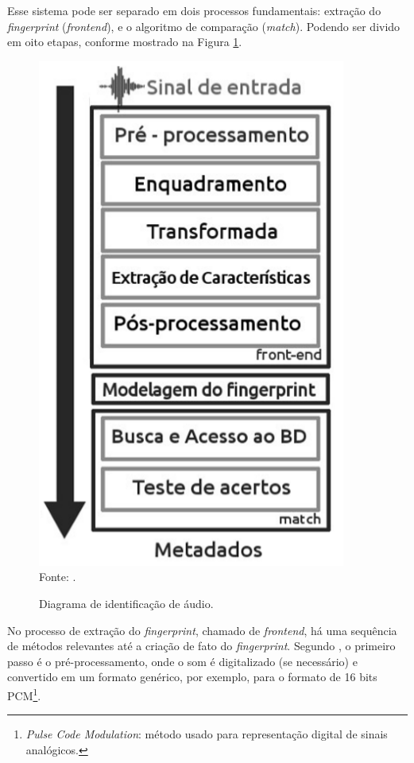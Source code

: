 Esse sistema pode ser separado em dois processos fundamentais: extração do \textit{fingerprint} (\textit{frontend}), e o algoritmo de comparação (\textit{match}). Podendo ser divido em oito etapas, conforme mostrado na Figura \ref{fig:etapasFinger}.

\begin{figure}[!htb]
   \centering
   \caption{Diagrama de identificação de áudio.}\label{fig:etapasFinger} 
   \includegraphics[scale=0.47]{figuras/etapasFinger.png}
   \\Fonte: \cite{carreira2015}.
\end{figure}

No processo de extração do \textit{fingerprint}, chamado de \textit{frontend}, há uma sequência de métodos relevantes até a criação de fato do \textit{fingerprint}. Segundo , o primeiro passo é o pré-processamento, onde o som é digitalizado (se necessário) e convertido em um formato genérico, por exemplo, para o formato de 16 bits PCM\footnote{\textit{Pulse Code Modulation}: método usado para representação digital de sinais analógicos.}.

